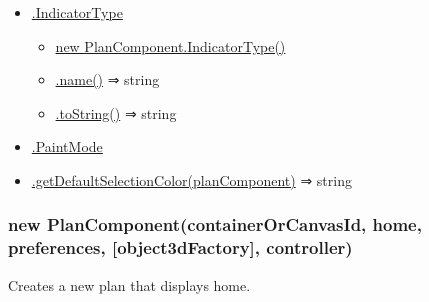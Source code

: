 \documentclass[a4paper]{report}
\providecommand{\tightlist}{%
  \setlength{\itemsep}{0pt}\setlength{\parskip}{0pt}}
\begin{document}
\begin{itemize}
\begin{itemize}
    \begin{itemize}
    \tightlist
    \item
      \protect\hyperlink{PlanComponent.IndicatorType}{.IndicatorType}

      \begin{itemize}
      \tightlist
      \item
        \protect\hyperlink{new_PlanComponent.IndicatorType_new}{new
        PlanComponent.IndicatorType()}
      \item
        \protect\hyperlink{PlanComponent.IndicatorType+name}{.name()} ⇒
        string
      \item
        \protect\hyperlink{PlanComponent.IndicatorType+toString}{.toString()}
        ⇒ string
      \end{itemize}
    \item
      \protect\hyperlink{PlanComponent.PaintMode}{.PaintMode}
    \item
      \protect\hyperlink{PlanComponent.getDefaultSelectionColor}{.getDefaultSelectionColor(planComponent)}
      ⇒ string
    \end{itemize}
  \end{itemize}
\end{itemize}

\hypertarget{new-plancomponentcontainerorcanvasid-home-preferences-object3dfactory-controller}{%
\subsubsection{new PlanComponent(containerOrCanvasId, home, preferences,
{[}object3dFactory{]},
controller)}\label{new-plancomponentcontainerorcanvasid-home-preferences-object3dfactory-controller}}

Creates a new plan that displays home.
\end{document}
